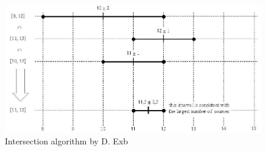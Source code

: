 \begin{figure}
	\centering
	\includegraphics[width=13cm,keepaspectratio]{fig/Marzullo_example-1.jpg}
	\caption{Intersection algorithm by D. Exb}
	\label{fig:ntp-intersection}
	\bigskip
\end{figure}

